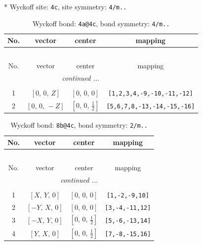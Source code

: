 \documentclass[fleqn,8pt]{jsarticle}
\begin{document}
* Wyckoff site: {\tt 4c}, site symmetry: {\tt 4/m..}
\renewcommand{\arraystretch}{1.2}
\begin{longtable}{cccc}
\caption{Wyckoff bond: {\tt 4a@4c}, bond symmetry: {\tt 4/m..}}
 \\
 \hline \hline
No. & vector & center & mapping \\ \hline \endfirsthead

\multicolumn{3}{l}{\tablename\ \thetable{}} \\
 \hline \hline
No. & vector & center & mapping \\ \hline \endhead

 \hline \hline
\multicolumn{3}{r}{\footnotesize\it continued ...} \\ \endfoot

 \hline \hline
\multicolumn{3}{r}{} \\ \endlastfoot

1 & $\left[ 0,\, 0,\, Z \right]$ & $\left[ 0,\, 0,\, 0 \right]$ & {\tt [1,2,3,4,-9,-10,-11,-12]} \\ \hline
2 & $\left[ 0,\, 0,\, - Z \right]$ & $\left[ 0,\, 0,\, \frac{1}{2} \right]$ & {\tt [5,6,7,8,-13,-14,-15,-16]} \\
\end{longtable}
\renewcommand{\arraystretch}{1.2}
\begin{longtable}{cccc}
\caption{Wyckoff bond: {\tt 8b@4c}, bond symmetry: {\tt 2/m..}}
 \\
 \hline \hline
No. & vector & center & mapping \\ \hline \endfirsthead

\multicolumn{3}{l}{\tablename\ \thetable{}} \\
 \hline \hline
No. & vector & center & mapping \\ \hline \endhead

 \hline \hline
\multicolumn{3}{r}{\footnotesize\it continued ...} \\ \endfoot

 \hline \hline
\multicolumn{3}{r}{} \\ \endlastfoot

1 & $\left[ X,\, Y,\, 0 \right]$ & $\left[ 0,\, 0,\, 0 \right]$ & {\tt [1,-2,-9,10]} \\ \hline
2 & $\left[ - Y,\, X,\, 0 \right]$ & $\left[ 0,\, 0,\, 0 \right]$ & {\tt [3,-4,-11,12]} \\ \hline
3 & $\left[ - X,\, Y,\, 0 \right]$ & $\left[ 0,\, 0,\, \frac{1}{2} \right]$ & {\tt [5,-6,-13,14]} \\ \hline
4 & $\left[ Y,\, X,\, 0 \right]$ & $\left[ 0,\, 0,\, \frac{1}{2} \right]$ & {\tt [7,-8,-15,16]} \\
\end{longtable}
\end{document}
